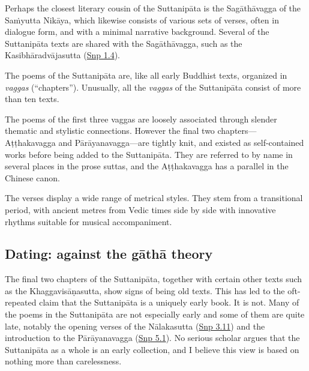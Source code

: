 \documentclass[12pt,openany]{book}%
\begin{document}
Perhaps the closest literary cousin of the \textsanskrit{Suttanipāta} is the \textsanskrit{Sagāthāvagga} of the \textsanskrit{Saṁyutta} \textsanskrit{Nikāya}, which likewise consists of various sets of verses, often in dialogue form, and with a minimal narrative background. Several of the \textsanskrit{Suttanipāta} texts are shared with the \textsanskrit{Sagāthāvagga}, such as the \textsanskrit{Kasibhāradvājasutta} (\href{https://suttacentral.net/snp1.4/en/sujato}{Snp 1.4}).

The poems of the \textsanskrit{Suttanipāta} are, like all early Buddhist texts, organized in \textit{vaggas} (“chapters”). Unusually, all the \textit{vaggas} of the \textsanskrit{Suttanipāta} consist of more than ten texts.

The poems of the first three vaggas are loosely associated through slender thematic and stylistic connections. However the final two chapters—\textsanskrit{Aṭṭhakavagga} and \textsanskrit{Pārāyanavagga}—are tightly knit, and existed as self-contained works before being added to the \textsanskrit{Suttanipāta}. They are referred to by name in several places in the prose suttas, and the \textsanskrit{Aṭṭhakavagga} has a parallel in the Chinese canon.

The verses display a wide range of metrical styles. They stem from a transitional period, with ancient metres from Vedic times side by side with innovative rhythms suitable for musical accompaniment.

\subsection*{Dating: against the \textsanskrit{gāthā} theory}

The final two chapters of the \textsanskrit{Suttanipāta}, together with certain other texts such as the \textsanskrit{Khaggavisāṇasutta}, show signs of being old texts. This has led to the oft-repeated claim that the \textsanskrit{Suttanipāta} is a uniquely early book. It is not. Many of the poems in the \textsanskrit{Suttanipāta} are not especially early and some of them are quite late, notably the opening verses of the \textsanskrit{Nālakasutta} (\href{https://suttacentral.net/snp3.11/en/sujato}{Snp 3.11}) and the introduction to the \textsanskrit{Pārāyanavagga} (\href{https://suttacentral.net/snp5.1/en/sujato}{Snp 5.1}). No serious scholar argues that the \textsanskrit{Suttanipāta} as a whole is an early collection, and I believe this view is based on nothing more than carelessness.
\end{document}
